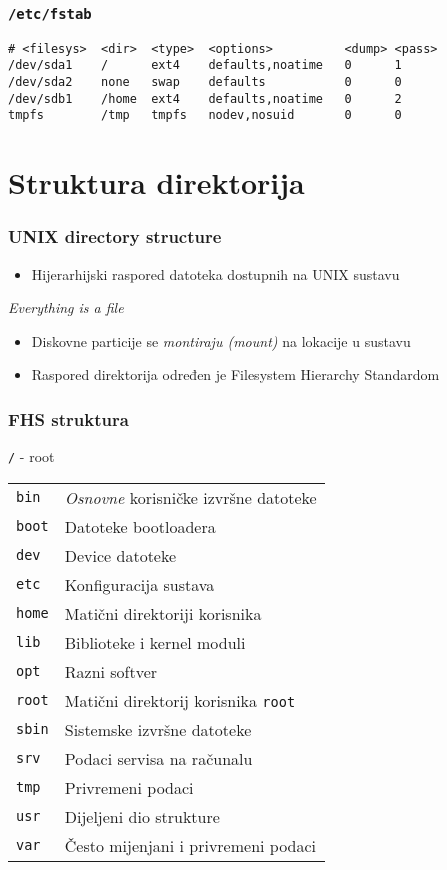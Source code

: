 \begin{frame}[fragile]
	\frametitle{\texttt{/etc/fstab}}
\begin{verbatim}
# <filesys>  <dir>  <type>  <options>          <dump> <pass>
/dev/sda1    /      ext4    defaults,noatime   0      1
/dev/sda2    none   swap    defaults           0      0
/dev/sdb1    /home  ext4    defaults,noatime   0      2
tmpfs        /tmp   tmpfs   nodev,nosuid       0      0
\end{verbatim}
\end{frame}

\section{Struktura direktorija}
\begin{frame}
	\frametitle{UNIX directory structure}
	\begin{itemize}
		\item Hijerarhijski raspored datoteka dostupnih na UNIX sustavu
	\end{itemize}
	\vfill
	\emph{Everything is a file}
	\vfill
	\begin{itemize}
		\item Diskovne particije se \emph{montiraju (mount)} na lokacije u sustavu
		\item Raspored direktorija određen je Filesystem Hierarchy Standardom
	\end{itemize}
	\vfill
\end{frame}

\begin{frame}
	\frametitle{FHS struktura}
	\texttt{/} - root\\
	\begin{tabular}{p{3cm} l}
		\texttt{bin} & \emph{Osnovne} korisničke izvršne datoteke \\
		\texttt{boot} & Datoteke bootloadera \\
		\texttt{dev} & Device datoteke \\
		\texttt{etc} & Konfiguracija sustava \\
		\texttt{home} & Matični direktoriji korisnika \\
		\texttt{lib} & Biblioteke i kernel moduli \\
		\texttt{opt} & Razni softver \\
		\texttt{root} & Matični direktorij korisnika \texttt{root} \\
		\texttt{sbin} & Sistemske izvršne datoteke \\
		\texttt{srv} & Podaci servisa na računalu \\
		\texttt{tmp} & Privremeni podaci \\
		\texttt{usr} & Dijeljeni dio strukture \\
		\texttt{var} & Često mijenjani i privremeni podaci 
	\end{tabular}
\end{frame}